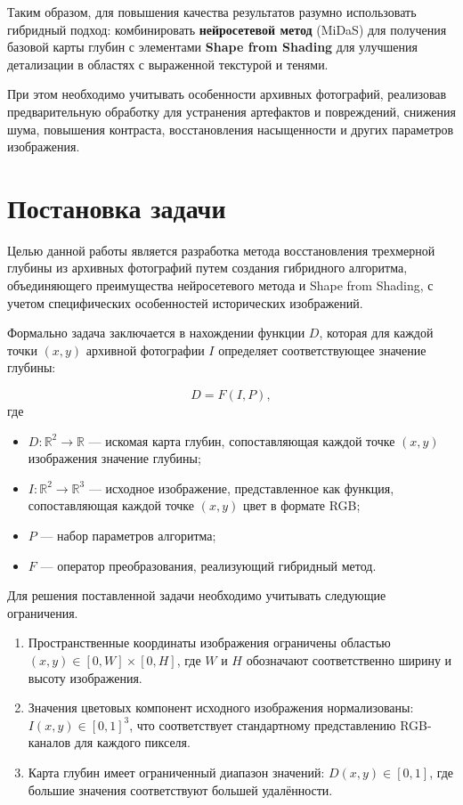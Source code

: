 Таким образом, для повышения качества результатов разумно использовать гибридный подход:
комбинировать \textbf{нейросетевой метод} (MiDaS) для получения базовой карты глубин с элементами \textbf{Shape from Shading} для улучшения детализации в областях с выраженной текстурой и тенями.

При этом необходимо учитывать особенности архивных фотографий, реализовав предварительную обработку для устранения артефактов и повреждений, снижения шума, повышения контраста, восстановления насыщенности и других параметров изображения.

\section{Постановка задачи}

Целью данной работы является разработка метода восстановления трехмерной глубины
из архивных фотографий путем создания гибридного алгоритма,
объединяющего преимущества нейросетевого метода и Shape from Shading,
с учетом специфических особенностей исторических изображений.

Формально задача заключается в нахождении функции $D$, которая для каждой точки $(x, y)$ архивной фотографии $I$ определяет соответствующее значение глубины:

\begin{equation}
D = F(I, P),
\end{equation}
где
\begin{itemize}
    \item $D : \mathbb{R}^2 \to \mathbb{R}$ --- искомая карта глубин, сопоставляющая каждой точке $(x, y)$ изображения значение глубины;
    \item $I : \mathbb{R}^2 \to \mathbb{R}^3$ --- исходное изображение, представленное как функция, сопоставляющая каждой точке $(x, y)$ цвет в формате RGB;
    \item $P$ --- набор параметров алгоритма;
    \item $F$ --- оператор преобразования, реализующий гибридный метод.
\end{itemize}

Для решения поставленной задачи необходимо учитывать следующие ограничения.
\begin{enumerate}
    \item Пространственные координаты изображения ограничены областью $(x, y) \in [0, W] \times [0, H]$, где $W$ и $H$ обозначают соответственно ширину и высоту изображения.
    \item Значения цветовых компонент исходного изображения нормализованы: $I(x, y) \in [0, 1]^3$, что соответствует стандартному представлению RGB-каналов для каждого пикселя.
    \item Карта глубин имеет ограниченный диапазон значений: $D(x, y) \in [0, 1]$, где большие значения соответствуют большей удалённости.
\end{enumerate}

